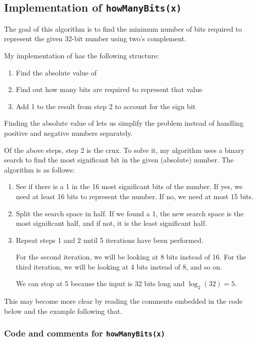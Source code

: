 \subsection{Implementation of \texttt{howManyBits(x)}}

The goal of this algorithm is to find the minimum number of bits required to represent the given 32-bit number using two's complement.

My implementation of  has the following structure:

\begin{enumerate}
  \item Find the absolute value of 
  \item Find out how many bits are required to represent that value
  \item Add 1 to the result from step 2 to account for the sign bit
\end{enumerate}

Finding the absolute value of  lets us simplify the problem instead of handling positive and negative numbers separately.

Of the above steps, step 2 is the crux. To solve it, my algorithm uses a binary search to find the most significant bit in the given (absolute) number. The algorithm is as follows:

\begin{enumerate}
  \item See if there is a 1 in the 16 most significant bits of the number. If yes, we need at least 16 bits to represent the number. If no, we need at most 15 bits.
  \item Split the search space in half. If we found a 1, the new search space is the most significant half, and if not, it is the least significant half.
  \item Repeat steps 1 and 2 until 5 iterations have been performed.

    For the second iteration, we will be looking at 8 bits instead of 16. For the third iteration, we will be looking at 4 bits instead of 8, and so on.

    We can stop at 5 because the input is 32 bits long and $\log_2(32) = 5$.
\end{enumerate}

This may become more clear by reading the comments embedded in the code below and the example following that.

\subsubsection{Code and comments for \texttt{howManyBits(x)}}

